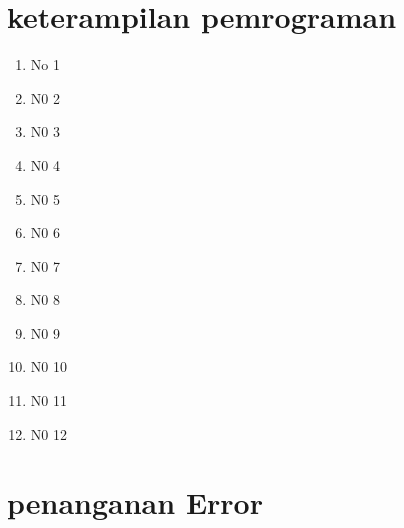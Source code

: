 \section{keterampilan pemrograman}
\begin{enumerate}

\item No 1


\item N0 2


\item N0 3


\item N0 4


\item N0 5


\item N0 6


\item N0 7


\item N0 8


\item N0 9


\item N0 10


\item N0 11


\item N0 12

\end{enumerate}

\section{penanganan Error}


